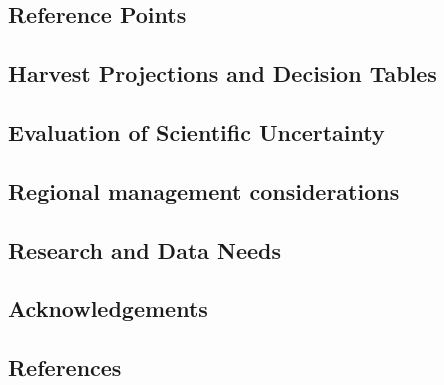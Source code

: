 \documentclass[
]{scrartcl}
\begin{document}
\subsection{Reference Points}\label{reference-points-1}

\subsection{Harvest Projections and Decision
Tables}\label{harvest-projections-and-decision-tables}

\subsection{Evaluation of Scientific
Uncertainty}\label{evaluation-of-scientific-uncertainty}

\subsection{Regional management
considerations}\label{regional-management-considerations}

\subsection{Research and Data Needs}\label{research-and-data-needs-1}

\newpage{}

\subsection{Acknowledgements}\label{sec-acknowledgements}

\newpage{}

\subsection{References}\label{references}
\end{document}
